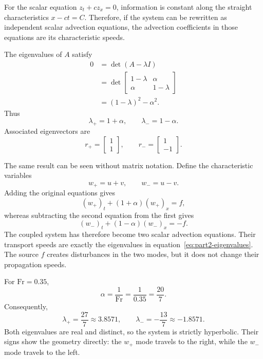 For the scalar equation $z_t+c z_x=0$, information is constant along the
straight characteristics $x-ct=C$. Therefore, if the system can be rewritten
as independent scalar advection equations, the advection coefficients in
those equations are its characteristic speeds.

The eigenvalues of $A$ satisfy
\begin{align}
 0&=\det(A-\lambda I)\\
  &=\det\begin{bmatrix}1-\lambda&\alpha\\
                \alpha&1-\lambda\end{bmatrix}\\
  &=(1-\lambda)^2-\alpha^2.
\end{align}
Thus
\begin{equation}
 \boxed{\lambda_+=1+\alpha,
 \qquad \lambda_-=1-\alpha.}
 \label{eq:part2-eigenvalues}
\end{equation}
Associated eigenvectors are
\[
 r_+=\begin{bmatrix}1\\1\end{bmatrix},
 \qquad
 r_-=\begin{bmatrix}1\\-1\end{bmatrix}.
\]

The same result can be seen without matrix notation. Define the characteristic
variables
\begin{equation}
 w_+=u+v,
 \qquad
 w_-=u-v.
\end{equation}
Adding the original equations gives
\begin{equation}
 (w_+)_t+(1+\alpha)(w_+)_x=f,
 \label{eq:wplus}
\end{equation}
whereas subtracting the second equation from the first gives
\begin{equation}
 (w_-)_t+(1-\alpha)(w_-)_x=-f.
 \label{eq:wminus}
\end{equation}
The coupled system has therefore become two scalar advection equations. Their
transport speeds are exactly the eigenvalues in
equation~\eqref{eq:part2-eigenvalues}. The source $f$ creates disturbances in
the two modes, but it does not change their propagation speeds.

For $\mathrm{Fr}=0.35$,
\[
 \alpha=\frac{1}{\mathrm{Fr}}
 =\frac{1}{0.35}=\frac{20}{7}.
\]
Consequently,
\begin{equation}
 \boxed{
 \lambda_+=\frac{27}{7}\approx3.8571,
 \qquad
 \lambda_-=-\frac{13}{7}\approx-1.8571.}
 \label{eq:part2-speeds}
\end{equation}
Both eigenvalues are real and distinct, so the system is strictly hyperbolic.
Their signs show the geometry directly: the $w_+$ mode travels to the right,
while the $w_-$ mode travels to the left.

